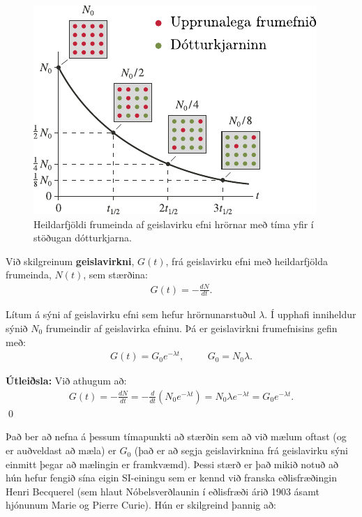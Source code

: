 \ifdefined \wholebook \else\documentclass[oneside]{book}\usepackage{EdlBook}\graphicspath{{figures/}}
\begin{document}
\begin{figure}[H]
    \centering
    \includegraphics[scale = 1]{figures/hrornun.pdf}
    \caption{Heildarfjöldi frumeinda af geislavirku efni hrörnar með tíma yfir í stöðugan dótturkjarna.}
\end{figure}

\begin{tcolorbox}
\begin{definition}
Við skilgreinum \textbf{geislavirkni}, $G(t)$, frá geislavirku efni með heildarfjölda frumeinda, $N(t)$, sem stærðina:
\begin{align*}
    G(t) = -\frac{dN}{dt}.
\end{align*}
\end{definition}
\end{tcolorbox}

\begin{tcolorbox}
\begin{theorem}
Lítum á sýni af geislavirku efni sem hefur hrörnunarstuðul $\lambda$. Í upphafi inniheldur sýnið $N_0$ frumeindir af geislavirka efninu. Þá er geislavirkni frumefnisins gefin með:
\begin{align*}
    G(t) = G_0e^{-\lambda t}, \hspace{1cm} G_0 = N_0 \lambda.
\end{align*}
\end{theorem}
\end{tcolorbox}

\textbf{Útleiðsla:} Við athugum að:
\begin{align*}
    G(t) = -\frac{dN}{dt} = -\frac{d}{dt}\left( N_0e^{-\lambda t} \right) = N_0 \lambda e^{-\lambda t} = G_0 e^{-\lambda t}.
\end{align*}
\qed

Það ber að nefna á þessum tímapunkti að stærðin sem að við mælum oftast (og er auðveldast að mæla) er $G_0$ (það er að segja geislavirknina frá geislavirku sýni einmitt þegar að mælingin er framkvæmd). Þessi stærð er það mikið notuð að hún hefur fengið sína eigin SI-einingu sem er kennd við franska eðlisfræðingin Henri Becquerel (sem hlaut Nóbelsverðlaunin í eðlisfræði árið 1903 ásamt hjónunum Marie og Pierre Curie). Hún er skilgreind þannig að:
\end{document}
